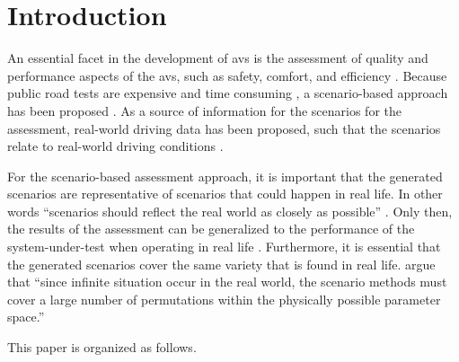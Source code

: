 \section{Introduction}
\label{sec:introduction}

An essential facet in the development of \acp{av} is the assessment of quality and performance aspects of the \acp{av}, such as safety, comfort, and efficiency \autocite{bengler2014threedecades, stellet2015taxonomy, koopman2016challenges}. 
Because public road tests are expensive and time consuming \autocite{kalra2016driving, zhao2018evaluation}, a scenario-based approach has been proposed \autocite{riedmaier2020survey, elrofai2018scenario, putz2017pegasus, krajewski2018highD, deGelder2017assessment, stellet2015taxonomy, jacobo2019development}.
As a source of information for the scenarios for the assessment, real-world driving data has been proposed, such that the scenarios relate to real-world driving conditions \autocite{elrofai2018scenario, putz2017pegasus, krajewski2018highD}.

For the scenario-based assessment approach, it is important that the generated scenarios are representative of scenarios that could happen in real life. 
In other words ``scenarios should reflect the real world as closely as possible'' \autocite{riedmaier2020survey}.
Only then, the results of the assessment can be generalized to the performance of the system-under-test when operating in real life \autocite{deGelder2017assessment}.
Furthermore, it is essential that the generated scenarios cover the same variety that is found in real life. 
\textcite{riedmaier2020survey} argue that ``since infinite situation occur in the real world, the scenario methods must cover a large number of permutations within the physically possible parameter space.''


This paper is organized as follows.

